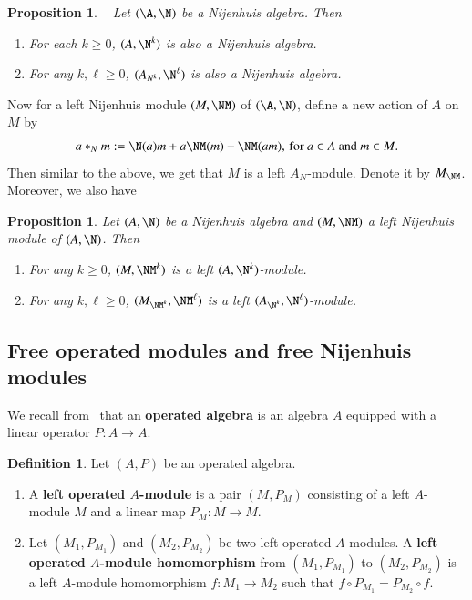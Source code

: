 \documentclass[12pt]{amsart}
\newtheorem{prop}[theorem]{Proposition}
\theoremstyle{definition}
\newtheorem{defn}[theorem]{Definition}
\renewcommand\geq{\geqslant}
\begin{document}
\begin{prop}~
Let $(\A,\N)$ be a Nijenhuis algebra. Then

\begin{enumerate}
\item For each $k \geq 0$, $(A,\N^k)$ is also a Nijenhuis algebra.
\item For any $k, \ell \geq 0$, $(A_{N^k}, \N^{\ell})$ is also a Nijenhuis algebra.
\end{enumerate}
\end{prop}
Now for a left Nijenhuis module $(M,\NM)$ of $(\A,\N)$, define a new action of $A$ on $M$ by 
\[
a \ast_N m :=\N(a)m+a \NM(m)-\NM(am), \, \text{for $a \in A$ and $m \in M$}.
\]
Then similar to the above, we get that $M$ is a left $A_N$-module. Denote it by $M_{\NM}$. Moreover, we also have 
\begin{prop}
Let $(A,\N)$ be a Nijenhuis algebra and $(M,\NM)$ a left Nijenhuis module of $(A,\N)$. Then
\begin{enumerate}
\item For any $k \geq 0$, $(M,\NM^k)$ is a left $(A,\N^k)$-module.
\item For any $k, \ell \geq 0$, $(M_{\NM^k}, \NM^\ell)$ is a left $(A_{\N^k}, \N^{\ell})$-module.
\end{enumerate}
\end{prop}

\subsection{Free operated modules and free Nijenhuis modules}

We recall from~ that an {\bf operated algebra} is an algebra $A$ equipped with a linear operator $P:A\to A$.

\begin{defn}
Let $(A, P)$ be an operated algebra.
\begin{enumerate}
\item A {\bf left operated $A$-module} is a pair $(M,P_M)$ consisting of a left $A$-module $M$ and a linear map $P_M:M \to M$.

\item Let $(M_1,P_{M_1})$ and $(M_2,P_{M_2})$ be two left operated $A$-modules. A {\bf left operated $A$-module homomorphism} from $(M_1,P_{M_1})$ to $(M_2,P_{M_2})$ is a left $A$-module homomorphism $f:M_1 \to M_2$ such that $f\circ P_{M_1} = P_{M_2} \circ f$.
\end{enumerate}
\end{defn}
\end{document}
